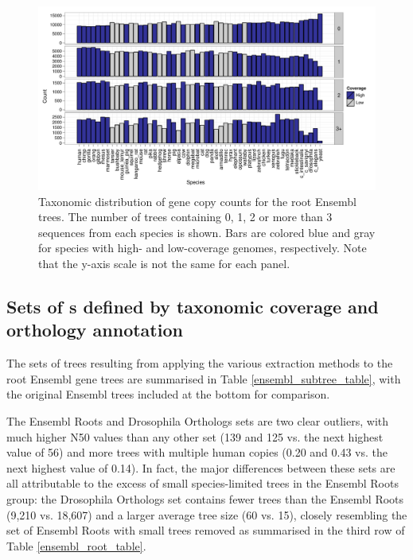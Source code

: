 \begin{landscape}
\begin{figure}
\centering
\includegraphics[scale=0.9]{Figs/ortholog_root_dups.pdf}
\caption{Taxonomic distribution of gene copy counts for the root
  Ensembl trees. The number of trees containing 0, 1, 2 or more than 3
  sequences from each species is shown. Bars are colored blue and gray
  for species with high- and low-coverage genomes, respectively. Note
  that the y-axis scale is not the same for each panel.}
\label{ortholog_root_dups}
\end{figure}
\end{landscape}

\subsection{Sets of \subtr{}s defined by taxonomic coverage and orthology annotation}

The sets of trees resulting from applying the various \subtr
extraction methods to the root Ensembl gene trees are summarised in
Table \ref{ensembl_subtree_table}, with the original Ensembl trees
included at the bottom for comparison.

The Ensembl Roots and Drosophila Orthologs sets are two clear
outliers, with much higher N50 values than any other set (139 and 125
vs. the next highest value of 56) and more trees with multiple human
copies (0.20 and 0.43 vs. the next highest value of 0.14). In fact,
the major differences between these sets are all attributable to the
excess of small species-limited trees in the Ensembl Roots group: the
Drosophila Orthologs set contains fewer trees than the Ensembl Roots
(9,210 vs. 18,607) and a larger average tree size (60 vs. 15), closely
resembling the set of Ensembl Roots with small trees removed as
summarised in the third row of Table \ref{ensembl_root_table}.

